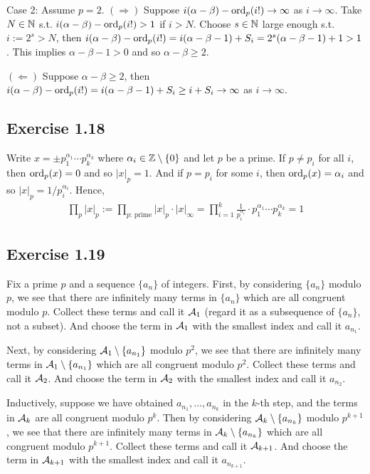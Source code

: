 \documentclass[../Koblitz.tex]{subfiles}
\begin{document}
Case 2: Assume $p=2$. $(\Rightarrow)$ Suppose $i(\alpha-\beta)-\operatorname{ord}_p(i!)\to\infty$ as $i\to\infty$. Take $N\in\mathbb{N}$ s.t. $i(\alpha-\beta)-\operatorname{ord}_p(i!) > 1$ if $i>N$. Choose $s\in\mathbb{N}$ large enough s.t. $i:=2^s>N$, then $i(\alpha-\beta)-\operatorname{ord}_p(i!) = i(\alpha-\beta-1)+S_i = 2^s(\alpha-\beta-1) +1 >1$. This implies $\alpha-\beta-1>0$ and so $\alpha-\beta\geq 2$.

$(\Leftarrow)$ Suppose $\alpha-\beta\geq 2$, then $i(\alpha-\beta)-\operatorname{ord}_p(i!) = i(\alpha-\beta-1)+S_i \geq i+S_i \to \infty$ as $i\to\infty$.

\subsection*{Exercise 1.18}

Write $x=\pm p_1^{\alpha_1}\cdots p_k^{\alpha_k}$ where $\alpha_i\in\mathbb{Z}\setminus\{0\}$ and let $p$ be a prime. If $p\neq p_i$ for all $i$, then $\operatorname{ord}_p(x)=0$ and so $|x|_p=1$. And if $p=p_i$ for some $i$, then $\operatorname{ord}_p(x)=\alpha_i$ and so $|x|_p=1/p_i^{\alpha_i}$. Hence,
\begin{align*}
\prod_p |x|_p := \prod_{p\text{: prime}} |x|_p \cdot |x|_\infty = \prod_{i=1}^k \frac{1}{p_i^{\alpha_i}} \cdot p_1^{\alpha_1}\cdots p_k^{\alpha_k} = 1
\end{align*}

\subsection*{Exercise 1.19}

Fix a prime $p$ and a sequence $\{a_n\}$ of integers. First, by considering $\{a_n\}$ modulo $p$, we see that there are infinitely many terms in $\{a_n\}$ which are all congruent modulo $p$. Collect these terms and call it $\mathcal{A}_1$ (regard it as a subsequence of $\{a_n\}$, not a subset). And choose the term in $\mathcal{A}_1$ with the smallest index and call it $a_{n_1}$.

Next, by considering $\mathcal{A}_1\setminus\{a_{n_1}\}$ modulo $p^2$, we see that there are infinitely many terms in $\mathcal{A}_1\setminus\{a_{n_1}\}$ which are all congruent modulo $p^2$. Collect these terms and call it $\mathcal{A}_2$. And choose the term in $\mathcal{A}_2$ with the smallest index and call it $a_{n_2}$.

Inductively, suppose we have obtained $a_{n_1},\ldots,a_{n_k}$ in the $k$-th step, and the terms in $\mathcal{A}_k$ are all congruent modulo $p^k$. Then by considering $\mathcal{A}_k\setminus\{a_{n_k}\}$ modulo $p^{k+1}$, we see that there are infinitely many terms in $\mathcal{A}_k\setminus\{a_{n_k}\}$ which are all congruent modulo $p^{k+1}$. Collect these terms and call it $\mathcal{A}_{k+1}$. And choose the term in $\mathcal{A}_{k+1}$ with the smallest index and call it $a_{n_{k+1}}$.
\end{document}
